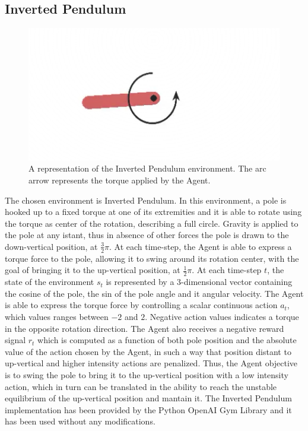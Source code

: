         \subsection{Inverted Pendulum}
            \begin{figure}[!b]
                        \centering
                        \includegraphics[width=13cm, keepaspectratio]{images/results/pendulum.png}
                        \caption{A representation of the Inverted Pendulum environment. The arc arrow represents the torque applied by the Agent.}
                        \label{fig:results_pendulum}
            \end{figure}
            The chosen environment is Inverted Pendulum. In this environment, a pole is hooked up to a fixed torque at one of its extremities and it is able to rotate using the torque as center of the rotation, describing a full circle. Gravity is applied to the pole at any istant, thus in absence of other forces the pole is drawn to the down-vertical position, at $\frac{3}{2}\pi$. At each time-step, the Agent is able to express a torque force to the pole, allowing it to swing around its rotation center, with the goal of bringing it to the up-vertical position, at $\frac{1}{2}\pi$. \newline
            At each time-step $t$, the state of the environment $s_t$ is represented by a 3-dimensional vector containing the cosine of the pole, the sin of the pole angle and it angular velocity. The Agent is able to express the torque force by controlling a scalar continuous action $a_t$, which values ranges between $-2$ and $2$. Negative action values indicates a torque in the opposite rotation direction. The Agent also receives a negative reward signal $r_t$ which is computed as a function of both pole position and the absolute value of the action chosen by the Agent, in such a way that position distant to up-vertical and higher intensity actions are penalized. Thus, the Agent objective is to swing the pole to bring it to the up-vertical position with a low intensity action, which in turn can be translated in the ability to reach the unstable equilibrium of the up-vertical position and mantain it. The Inverted Pendulum implementation has been provided by the Python OpenAI Gym Library and it has been used without any modifications. \newline
